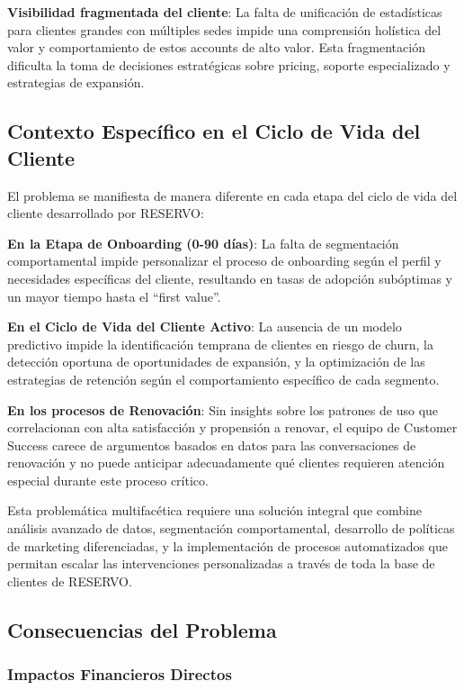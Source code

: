 \textbf{Visibilidad fragmentada del cliente}: La falta de unificación de estadísticas para clientes grandes con múltiples sedes impide una comprensión holística del valor y comportamiento de estos accounts de alto valor. Esta fragmentación dificulta la toma de decisiones estratégicas sobre pricing, soporte especializado y estrategias de expansión.

\subsection{Contexto Específico en el Ciclo de Vida del Cliente}

El problema se manifiesta de manera diferente en cada etapa del ciclo de vida del cliente desarrollado por RESERVO:

\textbf{En la Etapa de Onboarding (0-90 días)}: La falta de segmentación comportamental impide personalizar el proceso de onboarding según el perfil y necesidades específicas del cliente, resultando en tasas de adopción subóptimas y un mayor tiempo hasta el ``first value''.

\textbf{En el Ciclo de Vida del Cliente Activo}: La ausencia de un modelo predictivo impide la identificación temprana de clientes en riesgo de churn, la detección oportuna de oportunidades de expansión, y la optimización de las estrategias de retención según el comportamiento específico de cada segmento.

\textbf{En los procesos de Renovación}: Sin insights sobre los patrones de uso que correlacionan con alta satisfacción y propensión a renovar, el equipo de Customer Success carece de argumentos basados en datos para las conversaciones de renovación y no puede anticipar adecuadamente qué clientes requieren atención especial durante este proceso crítico.

Esta problemática multifacética requiere una solución integral que combine análisis avanzado de datos, segmentación comportamental, desarrollo de políticas de marketing diferenciadas, y la implementación de procesos automatizados que permitan escalar las intervenciones personalizadas a través de toda la base de clientes de RESERVO.

\subsection{Consecuencias del Problema}

\subsubsection{Impactos Financieros Directos}

